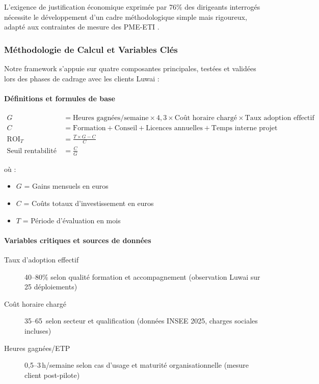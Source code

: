 L'exigence de justification économique exprimée par 76\% des dirigeants interrogés nécessite le développement d'un cadre méthodologique simple mais rigoureux, adapté aux contraintes de mesure des PME-ETI \cite{kaplan1996balanced}.

\subsubsection{Méthodologie de Calcul et Variables Clés}

Notre framework s'appuie sur quatre composantes principales, testées et validées lors des phases de cadrage avec les clients Luwai :

\paragraph{Définitions et formules de base}
\begin{align}
G &= \text{Heures gagnées/semaine} \times 4{,}3 \times \text{Coût horaire chargé} \times \text{Taux adoption effectif} \\
C &= \text{Formation} + \text{Conseil} + \text{Licences annuelles} + \text{Temps interne projet} \\
\text{ROI}_T &= \frac{T \times G - C}{C} \\
\text{Seuil rentabilité (mois)} &= \frac{C}{G}
\end{align}

où :
\begin{itemize}
    \item \(G\) = Gains mensuels en euros
    \item \(C\) = Coûts totaux d'investissement en euros
    \item \(T\) = Période d'évaluation en mois
\end{itemize}

\paragraph{Variables critiques et sources de données}
\begin{description}
    \item[Taux d'adoption effectif] 40--80\% selon qualité formation et accompagnement (observation Luwai sur 25 déploiements)
    \item[Coût horaire chargé] 35--65\,\texteuro{} selon secteur et qualification (données INSEE 2025, charges sociales incluses)
    \item[Heures gagnées/ETP] 0{,}5--3\,h/semaine selon cas d'usage et maturité organisationnelle (mesure client post-pilote)
\end{description}

